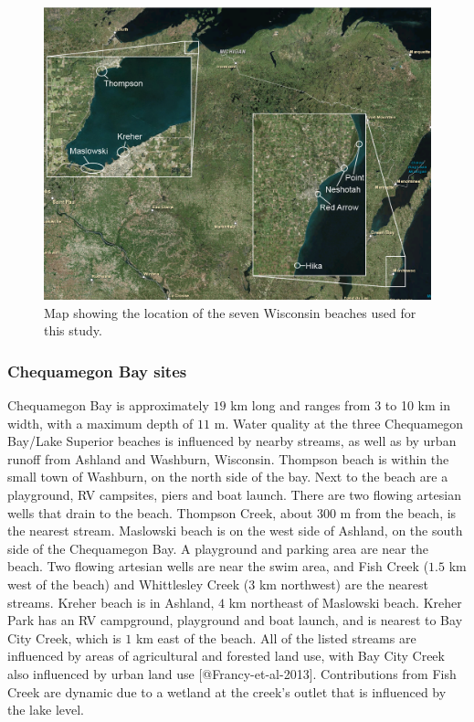 \begin{figure}
    \includegraphics{../figures/sites.png}
    \caption{Map showing the location of the seven Wisconsin beaches used for this study.}
    \label{fig:sites}
\end{figure}

\subsubsection{Chequamegon Bay sites}\label{chequamegon-bay-sites}

Chequamegon Bay is approximately \(19\) km long and ranges from 3 to 10
km in width, with a maximum depth of \(11\) m. Water quality at the
three Chequamegon Bay/Lake Superior beaches is influenced by nearby
streams, as well as by urban runoff from Ashland and Washburn,
Wisconsin. Thompson beach is within the small town of Washburn, on the
north side of the bay. Next to the beach are a playground, RV campsites,
piers and boat launch. There are two flowing artesian wells that drain
to the beach. Thompson Creek, about \(300\) m from the beach, is the
nearest stream. Maslowski beach is on the west side of Ashland, on the
south side of the Chequamegon Bay. A playground and parking area are
near the beach. Two flowing artesian wells are near the swim area, and
Fish Creek (\(1.5\) km west of the beach) and Whittlesley Creek (\(3\)
km northwest) are the nearest streams. Kreher beach is in Ashland, \(4\)
km northeast of Maslowski beach. Kreher Park has an RV campground,
playground and boat launch, and is nearest to Bay City Creek, which is
\(1\) km east of the beach. All of the listed streams are influenced by
areas of agricultural and forested land use, with Bay City Creek also
influenced by urban land use {[}@Francy-et-al-2013{]}. Contributions
from Fish Creek are dynamic due to a wetland at the creek's outlet that
is influenced by the lake level.

